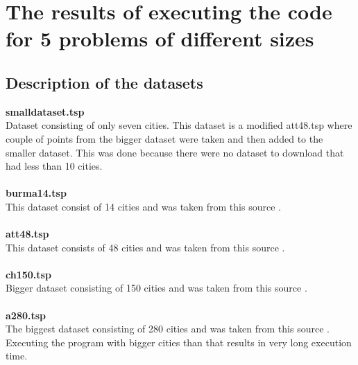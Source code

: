\documentclass[12pt]{report}
\begin{document}
    \section{The results of executing the code for 5 problems of different sizes}

    \subsection{Description of the datasets}
    \textbf{smalldataset.tsp}\\
    Dataset consisting of only seven cities. This dataset is a modified att48.tsp where couple of points from the bigger dataset were taken and then added to the smaller dataset. This was done because there were no dataset to download that had less than 10 cities.\\
    \\
    \textbf{burma14.tsp}\\
    This dataset consist of 14 cities and was taken from this source \cite{DatasetSource}.\\
    \\
    \textbf{att48.tsp}\\
    This dataset consists of 48 cities and was taken from this source \cite{att48Data}.\\
    \\
    \textbf{ch150.tsp}\\
    Bigger dataset consisting of 150 cities and was taken from this source \cite{DatasetSource}.\\
    \\
    \textbf{a280.tsp}\\
    The biggest dataset consisting of 280 cities and was taken from this source \cite{DatasetSource}. Executing the program with bigger cities than that results in very long execution time. 
\end{document}
